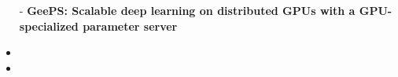 \begin{itemize}
	\item [-] \textbf{GeePS: Scalable deep learning on distributed GPUs with a GPU-specialized parameter server}
\end{itemize}

\begin{itemize}
	\item %
	\item 
\end{itemize}








\endinput
